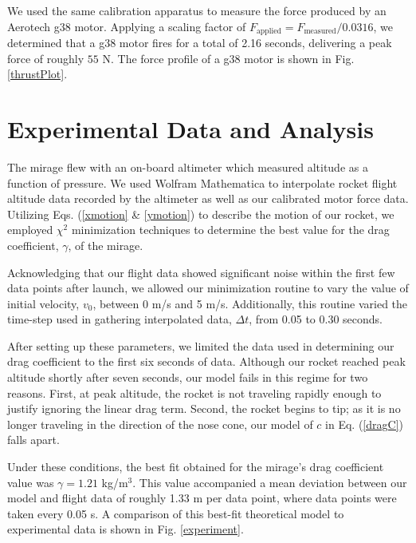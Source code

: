 \documentclass[aps,pra,twocolumn]{revtex4-1}
\begin{document}
We used the same calibration apparatus to measure the force produced by an Aerotech g38 motor.  Applying a scaling factor of $F_\text{applied} = F_\text{measured}/0.0316$, we determined that a g38 motor fires for a total of 2.16 seconds, delivering a peak force of roughly $55$ N.  The force profile of a g38 motor is shown in Fig. \ref{thrustPlot}.



\section{\label{section 4} Experimental Data and Analysis}
The mirage flew with an on-board altimeter which measured altitude as a function of pressure.  We used Wolfram Mathematica to interpolate rocket flight altitude data recorded by the altimeter as well as our calibrated motor force data.  Utilizing Eqs. (\ref{xmotion} \& \ref{ymotion}) to describe the motion of our rocket, we employed $\chi^2$ minimization techniques to determine the best value for the drag coefficient, $\gamma$, of the mirage.

Acknowledging that our flight data showed significant noise within the first few data points after launch, we allowed our minimization routine to vary the value of initial velocity, $v_0$, between 0 m/s and 5 m/s.  Additionally, this routine varied the time-step used in gathering interpolated data, $\Delta t$, from 0.05 to 0.30 seconds.  

After setting up these parameters, we limited the data used in determining our drag coefficient to the first six seconds of data.  Although our rocket reached peak altitude shortly after seven seconds, our model fails in this regime for two reasons.  First, at peak altitude, the rocket is not traveling rapidly enough to justify ignoring the linear drag term.  Second, the rocket begins to tip; as it is no longer traveling in the direction of the nose cone, our model of $c$ in Eq. (\ref{dragC}) falls apart.

Under these conditions, the best fit obtained for the mirage's drag coefficient value was $\gamma =  1.21$ kg/m$^3$.  This value accompanied a mean deviation between our model and flight data of roughly 1.33 m per data point, where data points were taken every 0.05 s.  A comparison of this best-fit theoretical model to experimental data is shown in Fig. \ref{experiment}.
\end{document}
